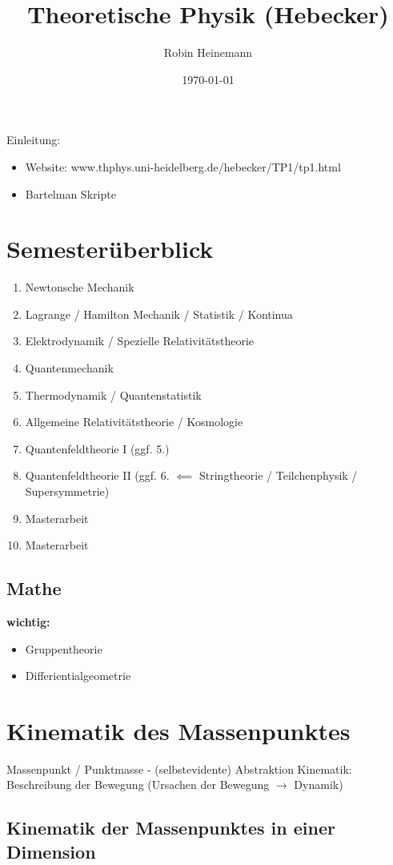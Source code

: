\documentclass[a4paper]{scrartcl}
\author{Robin Heinemann}
\date{\today}
\title{Theoretische Physik (Hebecker)}
\theoremstyle{definition}
\theoremstyle{plain}
\theoremstyle{remark}
\theoremstyle{remark}
\begin{document}
\maketitle
\tableofcontents

Einleitung: \\
\begin{itemize}
\item Website: www.thphys.uni-heidelberg.de/hebecker/TP1/tp1.html
\item Bartelman Skripte
\end{itemize}

\section{Semesterüberblick}
\label{sec-1}
\begin{enumerate}
\item Newtonsche Mechanik
\item Lagrange / Hamilton Mechanik / Statistik / Kontinua
\item Elektrodynamik / Spezielle Relativitätstheorie
\item Quantenmechanik
\item Thermodynamik / Quantenstatistik
\item Allgemeine Relativitätstheorie / Kosmologie
\item Quantenfeldtheorie I (ggf. 5.)
\item Quantenfeldtheorie II (ggf. 6. $\impliedby$ Stringtheorie / Teilchenphysik / Supersymmetrie)
\item Masterarbeit
\item Masterarbeit
\end{enumerate}
\subsection{Mathe}
\label{sec-1-1}
\textbf{wichtig:}
\begin{itemize}
\item Gruppentheorie
\item Differientialgeometrie
\end{itemize}
\section{Kinematik des Massenpunktes}
\label{sec-2}
Massenpunkt / Punktmasse - (selbstevidente) Abstraktion
Kinematik: Beschreibung der Bewegung (Ursachen der Bewegung $\rightarrow$ Dynamik)
\subsection{Kinematik der Massenpunktes in einer Dimension}
\label{sec-2-1}
\end{document}
